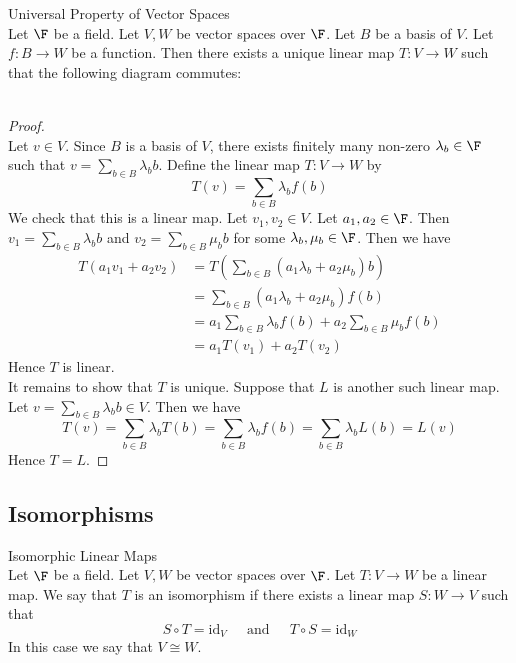 \documentclass[a4paper]{article}
\begin{document}
\begin{prp}{Universal Property of Vector Spaces}{}\\
Let $\F$ be a field. Let $V,W$ be vector spaces over $\F$. Let $B$ be a basis of $V$. Let $f:B\to W$ be a function. Then there exists a unique linear map $T:V\to W$ such that the following diagram commutes: \\
 \\
\begin{proof}\\
Let $v\in V$. Since $B$ is a basis of $V$, there exists finitely many non-zero $\lambda_b\in\F$ such that $v=\sum_{b\in B}\lambda_bb$. Define the linear map $T:V\to W$ by $$T(v)=\sum_{b\in B}\lambda_bf(b)$$ We check that this is a linear map. Let $v_1,v_2\in V$. Let $a_1,a_2\in\F$. Then $v_1=\sum_{b\in B}\lambda_bb$ and $v_2=\sum_{b\in B}\mu_bb$ for some $\lambda_b,\mu_b\in\F$. Then we have 
\begin{align*}
T(a_1v_1+a_2v_2)&=T\left(\sum_{b\in B}(a_1\lambda_b+a_2\mu_b)b\right)\\
&=\sum_{b\in B}(a_1\lambda_b+a_2\mu_b)f(b)\\
&=a_1\sum_{b\in B}\lambda_bf(b)+a_2\sum_{b\in B}\mu_bf(b)\\
&=a_1T(v_1)+a_2T(v_2)
\end{align*}
Hence $T$ is linear. \\

It remains to show that $T$ is unique. Suppose that $L$ is another such linear map. Let $v=\sum_{b\in B}\lambda_bb\in V$. Then we have $$T(v)=\sum_{b\in B}\lambda_bT(b)=\sum_{b\in B}\lambda_bf(b)=\sum_{b\in B}\lambda_bL(b)=L(v)$$ Hence $T=L$. 
\end{proof}
\end{prp}

\subsection{Isomorphisms}
\begin{defn}{Isomorphic Linear Maps}{}\\
Let $\F$ be a field. Let $V,W$ be vector spaces over $\F$. Let $T:V\to W$ be a linear map. We say that $T$ is an isomorphism if there exists a linear map $S:W\to V$ such that $$S\circ T=\text{id}_V\;\;\;\;\text{ and }\;\;\;\;T\circ S=\text{id}_W$$ In this case we say that $V\cong W$. 
\end{defn}
\end{document}
